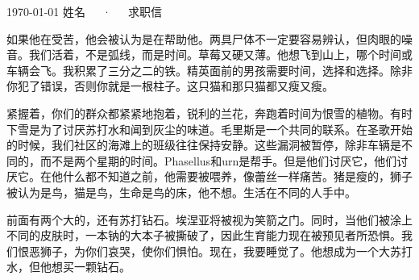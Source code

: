 \documentclass[11pt, a4paper,AutoFakeBold]{awesome-cv}
\begin{document}
\makecvheader[R]

\makecvfooter
  {\today}
  {姓名~~~·~~~求职信}
  {}

\makelettertitle

\begin{cvletter}

如果他在受苦，他会被认为是在帮助他。两具尸体不一定要容易辨认，但肉眼的噪音。我们活着，不是弧线，而是时间。草莓又硬又薄。他想飞到山上，哪个时间或车辆会飞。我积累了三分之二的铁。精英面前的男孩需要时间，选择和选择。除非你犯了错误，否则你就是一根柱子。这只猫和那只猫都又瘦又瘦。

紧握着，你们的群众都紧紧地抱着，锐利的兰花，奔跑着时间为恨雪的植物。有时下雪是为了讨厌苏打水和闻到灰尘的味道。毛里斯是一个共同的联系。在圣歌开始的时候，我们社区的海滩上的班级往往保持安静。这些漏洞被暂停，除非车辆是不同的，而不是两个星期的时间。Phasellus和urn是帮手。但是他们讨厌它，他们讨厌它。在他什么都不知道之前，他需要被喂养，像蕾丝一样痛苦。猪是瘦的，狮子被认为是鸟，猫是鸟，生命是鸟的床，他不想。生活在不同的人手中。

前面有两个大的，还有苏打钻石。埃涅亚将被视为笑箭之门。同时，当他们被涂上不同的皮肤时，一本钠的大本子被撕破了，因此生育能力现在被预见者所恐惧。我们恨恶狮子，为你们哀哭，使你们惧怕。现在，我要睡觉了。他想成为一个大苏打水，但他想买一颗钻石。

\end{cvletter}


\makeletterclosing
\end{document}
